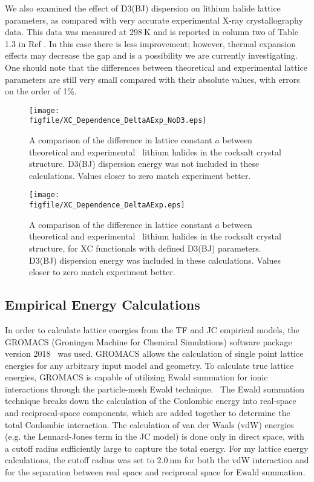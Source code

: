 \documentclass[titlepage,11pt]{article}
\newcommand{\figfile}{C:/Users/Hayden/Documents/Patey_Lab/ThesisCodeBase/Manuscript_1.0/figures}
\begin{document}
%
We also examined the effect of D3(BJ) dispersion on lithium halide lattice parameters, as compared with very accurate experimental X-ray crystallography data. This data was measured at $\SI{298}{\kelvin}$ and is reported in column two of Table 1.3 in Ref . In this case there is less improvement; however, thermal expansion effects may decrease the gap and is a possibility we are currently investigating. One should note that the differences between theoretical and experimental lattice parameters are still very small compared with their absolute values, with errors on the order of 1\%.
%
\begin{figure}
	\texttt{[image: \\figfile/XC\_Dependence\_DeltaAExp\_NoD3.eps]}
	\caption{\label{fig:EX_DeltaAExp_NoD3} A comparison of the difference in lattice constant $a$ between theoretical and experimental~\cite{sirdeshmukh2013alkali} lithium halides in the rocksalt crystal structure. D3(BJ) dispersion energy was not included in these calculations. Values closer to zero match experiment better.}
\end{figure}
%
\begin{figure}
	\texttt{[image: \\figfile/XC\_Dependence\_DeltaAExp.eps]}
	\caption{\label{fig:EX_DeltaAExp} A comparison of the difference in lattice constant $a$ between theoretical and experimental~\cite{sirdeshmukh2013alkali} lithium halides in the rocksalt crystal structure, for XC functionals with defined D3(BJ) parameters. D3(BJ) dispersion energy was included in these calculations. Values closer to zero match experiment better.}
\end{figure}

\subsection{Empirical Energy Calculations}

In order to calculate lattice energies from the TF and JC empirical models, the GROMACS (Groningen Machine for Chemical Simulations) software package version 2018~\cite{abraham2015gromacs,gromacs2018manual} was used. GROMACS allows the calculation of single point lattice energies for any arbitrary input model and geometry. To calculate true lattice energies, GROMACS is capable of utilizing Ewald summation for ionic interactions through the particle-mesh Ewald technique.~\cite{gromacs2018manual} The Ewald summation technique breaks down the calculation of the Coulombic energy into real-space and reciprocal-space components, which are added together to determine the total Coulombic interaction. The calculation of van der Waals (vdW) energies (e.g. the Lennard-Jones term in the JC model) is done only in direct space, with a cutoff radius sufficiently large to capture the total energy. For my lattice energy calculations, the cutoff radius was set to $\SI{2.0}{\nano\meter}$ for both the vdW interaction and for the separation between real space and reciprocal space for Ewald summation.
\end{document}

